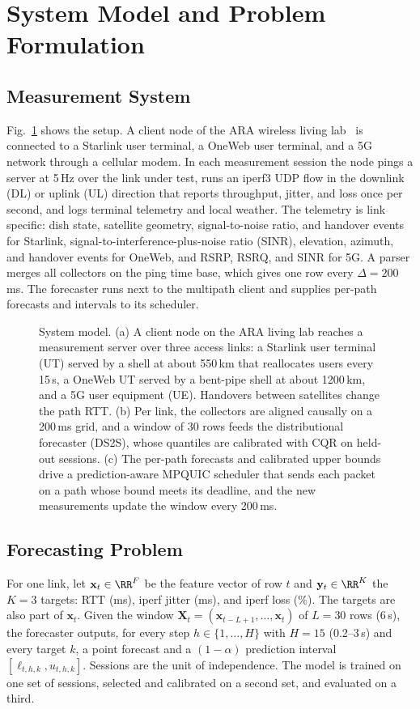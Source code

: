 \section{System Model and Problem Formulation}
\label{sec:system}
\subsection{Measurement System}
Fig.~\ref{fig:system} shows the setup. A client node of the ARA wireless living lab~\cite{islam2025design} is connected to a Starlink user terminal, a OneWeb user terminal, and a 5G network through a cellular modem. In each measurement session the node pings a server at 5\,Hz over the link under test, runs an iperf3 UDP flow in the downlink (DL) or uplink (UL) direction that reports throughput, jitter, and loss once per second, and logs terminal telemetry and local weather. The telemetry is link specific: dish state, satellite geometry, signal-to-noise ratio, and handover events for Starlink, signal-to-interference-plus-noise ratio (SINR), elevation, azimuth, and handover events for OneWeb, and RSRP, RSRQ, and SINR for 5G. A parser merges all collectors on the ping time base, which gives one row every $\Delta=200$\,ms. The forecaster runs next to the multipath client and supplies per-path forecasts and intervals to its scheduler.

\begin{figure}[t]
  \centering
  \resizebox{\textwidth}{!}{}
  \caption{System model. (a) A client node on the ARA living lab reaches a measurement server over three access links: a Starlink user terminal (UT) served by a shell at about 550\,km that reallocates users every 15\,s, a OneWeb UT served by a bent-pipe shell at about 1200\,km, and a 5G user equipment (UE). Handovers between satellites change the path RTT. (b) Per link, the collectors are aligned causally on a 200\,ms grid, and a window of 30 rows feeds the distributional forecaster (DS2S), whose quantiles are calibrated with CQR on held-out sessions. (c) The per-path forecasts and calibrated upper bounds drive a prediction-aware MPQUIC scheduler that sends each packet on a path whose bound meets its deadline, and the new measurements update the window every 200\,ms.}
  \label{fig:system}
\end{figure}

\subsection{Forecasting Problem}
For one link, let $\mathbf{x}_t\in\RR^{F}$ be the feature vector of row $t$ and $\mathbf{y}_t\in\RR^{K}$ the $K=3$ targets: RTT (ms), iperf jitter (ms), and iperf loss (\%). The targets are also part of $\mathbf{x}_t$. Given the window $\mathbf{X}_t=(\mathbf{x}_{t-L+1},\dots,\mathbf{x}_t)$ of $L=30$ rows (6\,s), the forecaster outputs, for every step $h\in\{1,\dots,H\}$ with $H=15$ (0.2--3\,s) and every target $k$, a point forecast and a $(1-\alpha)$ prediction interval $[\ell_{t,h,k},u_{t,h,k}]$. Sessions are the unit of independence. The model is trained on one set of sessions, selected and calibrated on a second set, and evaluated on a third.

